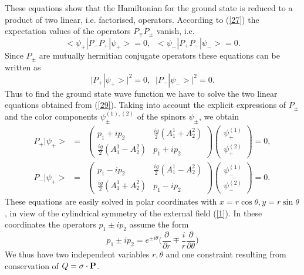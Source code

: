 \documentclass[a4paper,12pt,a4]{article}
\begin{document}
These equations show that the Hamiltonian for the
ground state is reduced to a product of two
linear, i.e. factorised, operators.
According to (\ref{27}) the expectation values of 
the operators $P_{\mp}P_{\pm}$ vanish, i.e.
\begin{equation}
<\psi_+|P_-P_+|\psi_+> = 0, \;\;
<\psi_-|P_+P_-|\psi_-> = 0.
\label{28}
\end{equation}
Since $P_{\pm}$ are mutually hermitian  conjugate operators
these equations can be written as 
\begin{equation}
\bigg|P_+|\psi_+>\bigg|^2=0, \;\;
\bigg|P_-|\psi_->\bigg|^2=0.
\label{29}
\end{equation}
Thus to find the ground state wave function we have to solve
the two linear equations obtained from (\ref{29}). Taking
into account the explicit expressions of $P_{\pm}$ and
the color components $\psi^{(1),(2)}_{\pm}$ of the spinors
$\psi_{\pm}$, we obtain
\begin{eqnarray} 
P_+|\psi_+> &=&\left(\begin{array}{cc}
p_1+ip_2 & \frac{ig}{2}(A^1_1+A^2_2)\\
\frac{ig}{2}(A^1_1-A^2_2) & p_1+ip_2
\end{array}\right)\left(\begin{array}{c} \psi^{(1)}_+\\
\psi^{(2)}_+\end{array}\right) = 0, \nonumber\\
P_-|\psi_+> &=&\left(\begin{array}{cc}
p_1-ip_2 & \frac{ig}{2}(A^1_1-A^2_2)\\
\frac{ig}{2}(A^1_1+A^2_2) & p_1-ip_2
\end{array}\right)\left(\begin{array}{c} \psi^{(1)}_-\\
\psi^{(2)}_-\end{array}\right) = 0.
\label{30}
\end{eqnarray}
These equations are easily solved in polar coordinates
with $ x=r\cos\theta, y= r\sin\theta$, in view of the cylindrical
symmetry of the external field (\ref{1}).
In these coordinates the operators $p_1\pm ip_2$
assume the form
\begin{equation}
p_1\pm ip_2 = e^{\pm i\theta}\bigg(\frac{\partial}{\partial r}\mp\frac{i}
{r}\frac{\partial}{\partial\theta}\bigg)
\label{31}
\end{equation}
We thus have two independent variables $r, \theta$
and one constraint resulting from conservation of
$Q={\bf \sigma}\cdot{\bf P}$. 
\end{document}
